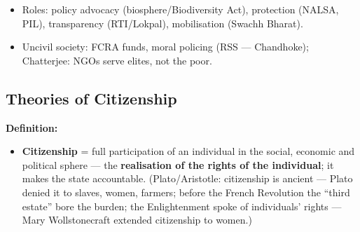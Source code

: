 \begin{QuickRevision}
\begin{itemize}
\item Roles: policy advocacy (biosphere/Biodiversity Act), protection (NALSA, PIL), transparency (RTI/Lokpal), mobilisation (Swachh Bharat).
\item Uncivil society: FCRA funds, moral policing (RSS --- Chandhoke); Chatterjee: NGOs serve elites, not the poor.
\end{itemize}
\end{QuickRevision}

\sectiondivider

\subsection{Theories of Citizenship}

\begin{KeyConcept}
\textbf{Definition:}
\begin{itemize}
\item \textbf{Citizenship} = full participation of an individual in the social, economic and political sphere --- the \textbf{realisation of the rights of the individual}; it makes the state accountable. (Plato/Aristotle: citizenship is ancient --- Plato denied it to slaves, women, farmers; before the French Revolution the ``third estate'' bore the burden; the Enlightenment spoke of individuals' rights --- Mary Wollstonecraft extended citizenship to women.)
\end{itemize}
\end{KeyConcept}

